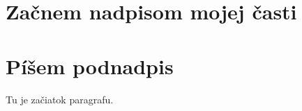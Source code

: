 



    \section{Začnem nadpisom mojej časti}
    \section{Píšem podnadpis}
    Tu je začiatok paragrafu.


